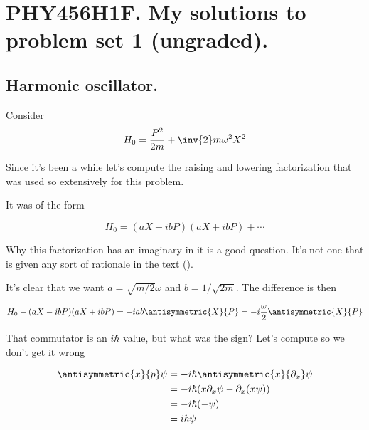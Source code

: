 
%

\chapter{PHY456H1F.  My solutions to problem set 1 (ungraded).}
\label{chap:phy456ps1}
{}
\date{Sept 12, 2011}

\beginArtWithToc

\section{Harmonic oscillator.}

Consider
\begin{equation}\label{eqn:phy456ps1:10}
H_0 = \frac{P^2}{2m} + \inv{2} m \omega^2 X^2
\end{equation}

Since it's been a while let's compute the raising and lowering factorization that was used so extensively for this problem.

It was of the form

\begin{equation}\label{eqn:phy456ps1:30}
H_0 = (a X - i b P)(a X + i b P) + \cdots
\end{equation}

Why this factorization has an imaginary in it is a good question.  It's not one that is given any sort of rationale in the text (\cite{desai2009quantum}).

It's clear that we want $a = \sqrt{m/2} \omega$ and $b = 1/\sqrt{2m}$.  The difference is then

\begin{equation}\label{eqn:phy456ps1:50}
H_0 - (a X - i b P)(a X + i b P)
=
- i a b \antisymmetric{X}{P}  = - i \frac{\omega}{2} \antisymmetric{X}{P}
\end{equation}

That commutator is an $i\hbar$ value, but what was the sign?  Let's compute so we don't get it wrong

\begin{align*}
\antisymmetric{x}{ p} \psi
&= -i \hbar \antisymmetric{x}{\partial_x} \psi \\
&= -i \hbar ( x \partial_x \psi - \partial_x (x \psi) ) \\
&= -i \hbar ( - \psi ) \\
&= i \hbar \psi
\end{align*}

